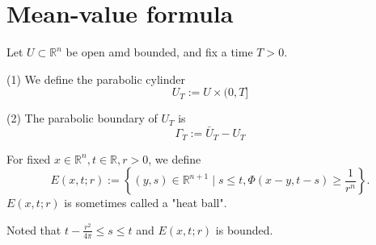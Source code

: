 \section{Mean-value formula}
\begin{definition}
    Let $U\subset \mathbb{R}^n$ be open amd bounded, and fix a time $T>0$.

    (1) We define the parabolic cylinder
    \begin{equation*}
        U_T:=U \times(0, T]
    \end{equation*}

    (2) The parabolic boundary of $U_T$ is
    \begin{equation*}
        \Gamma_T:=\bar{U}_T-U_T
    \end{equation*}
\end{definition}
\begin{definition}
    For fixed $x \in \mathbb{R}^n, t \in \mathbb{R}, r>0$, we define
    \begin{equation*}
        E(x, t ; r):=\left\{(y, s) \in \mathbb{R}^{n+1} \mid s \leq t, \Phi(x-y, t-s) \geq \frac{1}{r^n}\right\} .
    \end{equation*}
    $E(x, t ; r)$ is sometimes called a "heat ball".

    Noted that $t-\frac{r^2}{4 \pi} \leq  s \leq t $ and $E(x,t;r)$ is bounded.
\end{definition}
